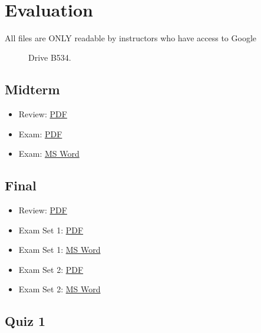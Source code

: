 \FILENAME\

\section{Evaluation}\label{evaluation}

\begin{description}
\item[All files are ONLY readable by instructors who have access to
Google]
Drive B534.
\end{description}

\subsection{Midterm}\label{midterm}

\begin{itemize}

\item
  Review:
  \href{https://drive.google.com/open?id=0B88HKpainTSfWGM1T1g1Tk1mYmM}{PDF}
\item
  Exam:
  \href{https://drive.google.com/open?id=0B88HKpainTSfS0syc1NEVDJjZDA}{PDF}
\item
  Exam:
  \href{https://drive.google.com/open?id=0B88HKpainTSfbXhROGptVi1iN1k}{MS
  Word}
\end{itemize}

\subsection{Final}\label{final}

\begin{itemize}

\item
  Review:
  \href{https://drive.google.com/open?id=0B88HKpainTSfRnV2WXZWbTNtLWc}{PDF}
\item
  Exam Set 1:
  \href{https://drive.google.com/open?id=0B88HKpainTSfWnVjVHpJTUFFYlU}{PDF}
\item
  Exam Set 1:
  \href{https://drive.google.com/open?id=0B88HKpainTSfNU1ldmItN3RIcUU}{MS
  Word}
\item
  Exam Set 2:
  \href{https://drive.google.com/open?id=0B88HKpainTSfTVZxMTZ4MC1sNFU}{PDF}
\item
  Exam Set 2:
  \href{https://drive.google.com/open?id=0B88HKpainTSfMGRzWDgtT1VDbEk}{MS
  Word}
\end{itemize}

\subsection{Quiz 1}\label{quiz-1}

